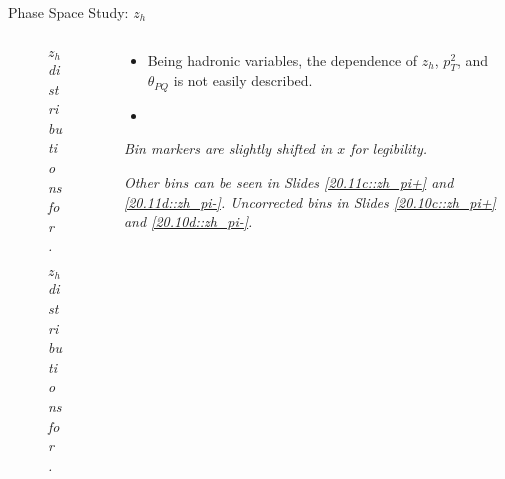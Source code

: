 \begin{frame}{Phase Space Study: $z_h$}
    \label{12.14::zh}

    \begin{columns}[onlytextwidth,T]

    \begin{column}{.44\linewidth}
        \vspace{-15pt}
        \begin{center}
            \begin{figure}[t]
                \scriptsize{\textit{$z_h$ distributions for \ef{$\pi^-$}.}}
            \end{figure}

            \vspace{-15pt}
            \begin{figure}[t]
                \scriptsize{\textit{$z_h$ distributions for \ef{$\pi^+$}.}}
            \end{figure}
        \end{center}
    \end{column}

    \begin{column}{.54\linewidth}
        \begin{itemize}
            \item
                Being hadronic variables, the \ef{$\theta$} dependence of $z_h$, $p_T^2$, and $\theta_{PQ}$ is not easily described.

            \vspace{12pt}
            \item
        \end{itemize}

        \vspace{111pt}

        \begin{flushright}
            \tiny{\textit{Bin markers are slightly shifted in $x$ for legibility.}}

            \tiny{\textit{
                Other bins can be seen in Slides \textcolor{efd_purple}{\ref{20.11c::zh_pi+}} and \textcolor{efd_purple}{\ref{20.11d::zh_pi-}}.
                Uncorrected bins in Slides \textcolor{efd_purple}{\ref{20.10c::zh_pi+}} and \textcolor{efd_purple}{\ref{20.10d::zh_pi-}}.
            }}
        \end{flushright}
    \end{column}

    \end{columns}
\end{frame}

